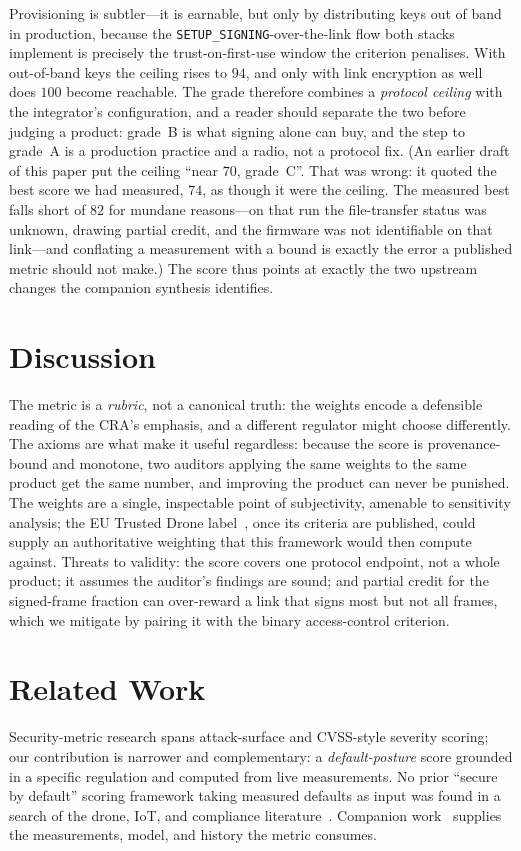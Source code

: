 \documentclass[conference]{IEEEtran}
\newcommand{\code}[1]{\texttt{#1}}
\begin{document}
Provisioning is subtler---it is earnable, but only by distributing keys out of
band in production, because the \code{SETUP\_SIGNING}-over-the-link flow both
stacks implement is precisely the trust-on-first-use window the criterion
penalises. With out-of-band keys the ceiling rises to $94$, and only with link
encryption as well does $100$ become reachable. The grade therefore combines a
\emph{protocol ceiling} with the integrator's configuration, and a reader should
separate the two before judging a product: grade~B is what signing alone can
buy, and the step to grade~A is a production practice and a radio, not a
protocol fix. (An earlier draft of this paper put the ceiling ``near $70$,
grade~C''. That was wrong: it quoted the best score we had measured, $74$, as
though it were the ceiling. The measured best falls short of $82$ for mundane
reasons---on that run the file-transfer status was unknown, drawing partial
credit, and the firmware was not identifiable on that link---and conflating a
measurement with a bound is exactly the error a published metric should not
make.) The score thus points at exactly the two upstream changes the
companion synthesis identifies.

\section{Discussion}
\label{sec:disc}
The metric is a \emph{rubric}, not a canonical truth: the weights encode a
defensible reading of the CRA's emphasis, and a different regulator might choose
differently. The axioms are what make it useful regardless: because the score is
provenance-bound and monotone, two auditors applying the same weights to the same
product get the same number, and improving the product can never be punished. The
weights are a single, inspectable point of subjectivity, amenable to sensitivity
analysis; the EU Trusted Drone label~\cite{ec2026droneactionplan}, once its
criteria are published, could supply an authoritative weighting that this
framework would then compute against. Threats to validity: the score covers one
protocol endpoint, not a whole product; it assumes the auditor's findings are
sound; and partial credit for the signed-frame fraction can over-reward a link
that signs most but not all frames, which we mitigate by pairing it with the
binary access-control criterion.

\section{Related Work}
Security-metric research spans attack-surface and CVSS-style severity scoring;
our contribution is narrower and complementary: a \emph{default-posture} score
grounded in a specific regulation and computed from live measurements. No prior
``secure by default'' scoring framework taking measured defaults as input was
found in a search of the drone, IoT, and compliance
literature~\cite{ruohonen2025sok,puliyski2025sora}. Companion
work~\cite{brighouse2026signing,brighouse2026formal,brighouse2026longitudinal}
supplies the measurements, model, and history the metric consumes.
\end{document}
